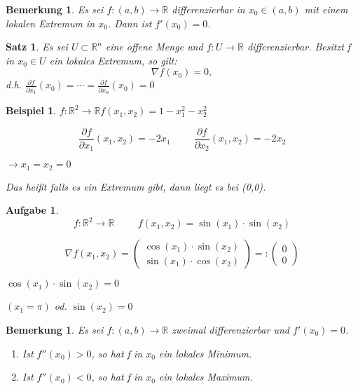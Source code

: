 \documentclass[12pt,a4paper]{scrreprt}
\newtheorem{bemerkung}[defi]{Bemerkung}
\newtheorem{beispiel}[defi]{Beispiel}
\newtheorem{satz}[defi]{Satz}
\newtheorem{aufg}[defi]{Aufgabe}
\begin{document}
\begin{bemerkung}
	Es sei $f:(a,b)\to\mathbb{R}$ differenzierbar in $x_0\in (a,b)$ mit einem lokalen Extremum in $x_0$. Dann ist $f'(x_0)=0$.
\end{bemerkung}

\begin{satz}
	Es sei $U \subset \mathbb{R}^n$ eine offene Menge und $f:U\to\mathbb{R}$ differenzierbar. Besitzt f in $x_0\in U$ ein lokales Extremum, so gilt:
	\[\nabla f(x_0)=0,\]
	d.h. $\frac{\partial f}{\partial x_1}(x_0)=\cdots=\frac{\partial f}{\partial x_n}(x_0)=0$
\end{satz}

\begin{beispiel}
	$f:\mathbb{R}^2\to\mathbb{R}$\hspace{1cm}$f(x_1,x_2)=1-x_1^2-x_2^2$
	
	\[\frac{\partial f}{\partial x_1}(x_1,x_2)=-2x_1\hspace{1cm}\frac{\partial f}{\partial x_2}(x_1,x_2)=-2x_2\]
	
	$\to x_1=x_2=0$
	
	Das heißt falls es ein Extremum gibt, dann liegt es bei (0,0).
\end{beispiel}

\begin{aufg}
	\[f:\mathbb{R}^2\to\mathbb{R}\hspace{1cm}f(x_1,x_2)=\sin(x_1)\cdot\sin(x_2)\]

	\[\nabla f(x_1,x_2)=\begin{pmatrix}
		\cos(x_1)\cdot\sin(x_2) \\
		\sin(x_1)\cdot\cos(x_2)
	\end{pmatrix} =: \begin{pmatrix}0 \\ 0\end{pmatrix}\]

		$\cos(x_1)\cdot\sin(x_2)=0$

		$(x_1=\pi)$ od. $\sin(x_2)=0$
\end{aufg}

\begin{bemerkung}
	Es sei $f:(a,b)\to\mathbb{R}$ zweimal differenzierbar und $f'(x_0)=0$.
	\begin{enumerate}[label=\emph{(\roman*)}]
		\item Ist $f''(x_0)>0$, so hat f in $x_0$ ein lokales Minimum.
		\item Ist $f''(x_0)<0$, so hat f in $x_0$ ein lokales Maximum.
	\end{enumerate}
\end{bemerkung}
\end{document}
